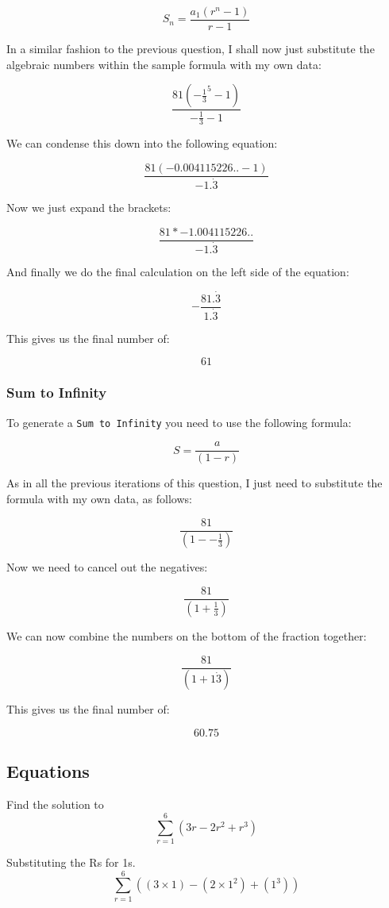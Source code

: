 \documentclass[a4paper,12pt]{article}
\begin{document}
\[
  S_n = \frac{a_1(r^n-1)}{r-1}
\]

In a similar fashion to the previous question, I shall now just substitute the algebraic numbers within the sample formula with my own data:

\[
  \frac{81(-\frac{1}{3}^5-1)}{-\frac{1}{3}-1}
\]

We can condense this down into the following equation:

\[
  \frac{81(-0.004115226..-1)}{-1.\dot{3}}
\]

Now we just expand the brackets:

\[
  \frac{81 * -1.004115226..}{-1.\dot{3}}
\]

And finally we do the final calculation on the left side of the equation:

\[
  -\frac{81.\dot{3}}{1.\dot{3}}
\]

This gives us the final number of:

\[
  61
\]

\newpage

\subsubsection{Sum to Infinity}
To generate a \texttt{Sum to Infinity} you need to use the following formula:

\[
  S = \frac{a}{(1-r)}
\]

As in all the previous iterations of this question, I just need to substitute the formula with my own data, as follows:

\[
  \frac{81}{(1--\frac{1}{3})}
\]

Now we need to cancel out the negatives:

\[
  \frac{81}{(1+\frac{1}{3})}
\]

We can now combine the numbers on the bottom of the fraction together:

\[
  \frac{81}{(1+1\dot{3})}
\]

This gives us the final number of:

\[
  60.75
\]

\newpage

\subsection{Equations}
Find the solution to
\[
  \sum_{r=1}^6 (3r - 2r^2 + r^3)
\]

Substituting the Rs for 1s.
\[
  \sum_{r=1}^6 ((3 \times 1) - (2 \times 1^2) + (1^3))
\]
\end{document}
